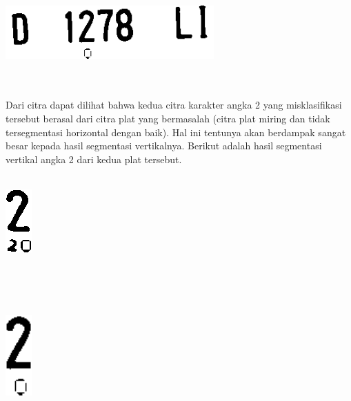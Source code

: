 \\
\\
\begin{adjustbox}{width=1\textwidth}
	\noindent\begin{minipage}{\linewidth}
		\centering\includegraphics[width=8cm]{images/D1278LI.png}
		\label{fig:CitraPlatMisklasifikasi}
	\end{minipage}
\end{adjustbox}\\
\\
\noindent Dari citra dapat dilihat bahwa kedua citra karakter angka 2 yang misklasifikasi tersebut berasal dari citra plat yang bermasalah (citra plat miring dan tidak tersegmentasi horizontal dengan baik). Hal ini tentunya akan berdampak sangat besar kepada hasil segmentasi vertikalnya. Berikut adalah hasil segmentasi vertikal angka 2 dari kedua plat tersebut.\\\\
\begin{adjustbox}{width=1\textwidth}
	\noindent\begin{minipage}{\linewidth}
		\centering\includegraphics[width=1cm]{images/2Misklasifikasi1.png}
	\end{minipage}
\end{adjustbox}\\\\\\
\begin{adjustbox}{width=1\textwidth}
	\noindent\begin{minipage}{\linewidth}
		\centering\includegraphics[width=1cm]{images/2Misklasifikasi2.png}
		\label{fig:CitraHasilSegmentasi2}
	\end{minipage}
\end{adjustbox}\\
